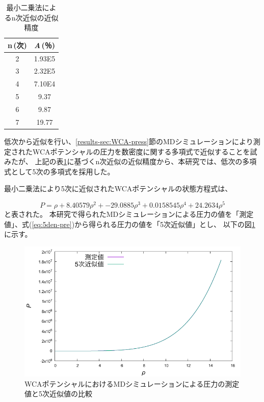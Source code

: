 \documentclass[titlepage]{jsreport}
\begin{document}
{{{\begin{table}[htbp]
    \begin{center}
        \caption{最小二乗法によるn次近似の近似精度}
            \begin{tabular}{c c}
               
                    n\,(次) & {\it{A}}\,(％) \\ \hline\hline
                    2 & 1.93E5 \\ 
                    3 & 2.32E5 \\ 
                    4 & 7.10E4\\ 
                    5 & 9.37\\ 
                    6 & 9.87 \\ 
                    7 & 19.77 \\ \hline
                
            \end{tabular}
    \end{center}
    \label{table:approximation-accuracy}
\end{table}

低次から近似を行い、\ref{results-sec:WCA-press}節のMDシミュレーションにより測定されたWCAポテンシャルの圧力を数密度に関する多項式で近似することを試みたが、
上記の表\ref{table:approximation-accuracy}に基づくn次近似の近似精度から、本研究では、低次の多項式として5次の多項式を採用した。

最小二乗法により5次に近似されたWCAポテンシャルの状態方程式は、

\large
\begin{equation}
    P=\rho+8.40579\rho^2+-29.0885\rho^3+0.0158545\rho^4+24.2634\rho^5 \label{eq:5den-pre}
\end{equation}
\normalsize
と表された。
本研究で得られたMDシミュレーションによる圧力の値を「測定値」、式(\ref{eq:5den-pre})から得られる圧力の値を「5次近似値」とし、
以下の図\ref{fig:5den-pre}に示す。

\begin{figure}[htbp]
    \begin{center}
        \includegraphics[width=14cm]{fig/5den-pre.pdf}
    \end{center}
    \caption{WCAポテンシャルにおけるMDシミュレーションによる圧力の測定値と5次近似値の比較}
    \label{fig:5den-pre}
\end{figure}

}}}
\end{document}
